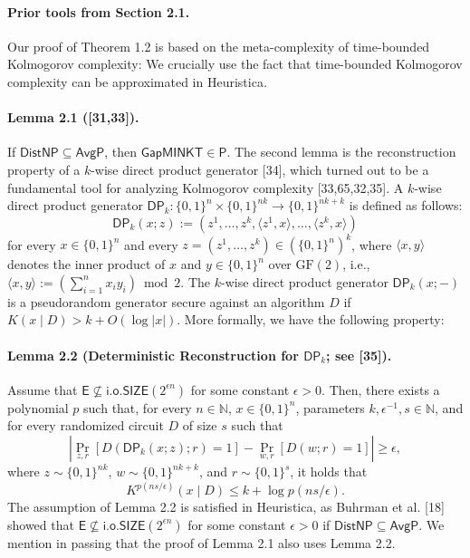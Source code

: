 \paragraph{Prior tools from Section 2.1.}
Our proof of Theorem 1.2 is based on the meta-complexity of time-bounded Kolmogorov complexity: We crucially use the fact that time-bounded Kolmogorov complexity can be approximated in Heuristica.
\paragraph{Lemma 2.1 ([31,33]).}
If $\mathsf{DistNP}\subseteq\mathsf{AvgP}$, then $\mathsf{GapMINKT}\in\mathsf P$.
The second lemma is the reconstruction property of a $k$-wise direct product generator [34], which turned out to be a fundamental tool for analyzing Kolmogorov complexity [33,65,32,35]. A $k$-wise direct product generator $\mathsf{DP}_k:\{0,1\}^n\times\{0,1\}^{nk}\to\{0,1\}^{nk+k}$ is defined as follows:
\[\mathsf{DP}_k(x;z):=(z^1,\ldots,z^k,\langle z^1,x\rangle,\ldots,\langle z^k,x\rangle)\]
for every $x\in\{0,1\}^n$ and every $z=(z^1,\ldots,z^k)\in(\{0,1\}^n)^k$, where $\langle x,y\rangle$ denotes the inner product of $x$ and $y\in\{0,1\}^n$ over $\mathrm{GF}(2)$, i.e., $\langle x,y\rangle:=(\sum_{i=1}^nx_iy_i)\bmod2$. The $k$-wise direct product generator $\mathsf{DP}_k(x;-)$ is a pseudorandom generator secure against an algorithm $D$ if $K(x\mid D)>k+O(\log|x|)$. More formally, we have the following property:
\paragraph{Lemma 2.2 (Deterministic Reconstruction for $\mathsf{DP}_k$; see [35]).}
Assume that $\mathsf E\not\subseteq\mathsf{i.o.SIZE}(2^{\epsilon n})$ for some constant $\epsilon>0$. Then, there exists a polynomial $p$ such that, for every $n\in\mathbb N$, $x\in\{0,1\}^n$, parameters $k,\epsilon^{-1},s\in\mathbb N$, and for every randomized circuit $D$ of size $s$ such that
\[\left|\Pr_{z,r}[D(\mathsf{DP}_k(x;z);r)=1]-\Pr_{w,r}[D(w;r)=1]\right|\geq\epsilon,\]
where $z\sim\{0,1\}^{nk}$, $w\sim\{0,1\}^{nk+k}$, and $r\sim\{0,1\}^s$, it holds that
\[K^{p(ns/\epsilon)}(x\mid D)\leq k+\log p(ns/\epsilon).\]
The assumption of Lemma 2.2 is satisfied in Heuristica, as Buhrman et al. [18] showed that $\mathsf E\not\subseteq\mathsf{i.o.SIZE}(2^{\epsilon n})$ for some constant $\epsilon>0$ if $\mathsf{DistNP}\subseteq\mathsf{AvgP}$. We mention in passing that the proof of Lemma 2.1 also uses Lemma 2.2.
